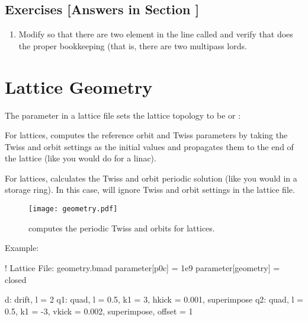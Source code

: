 \documentclass{hitec}     %
\newcommand{\Section}[1]{\section{#1}\vspace*{-1ex}}
\begin{document}
{\newpage

\subsection{Exercises [Answers in Section ]}
\label{s:multipass.ex}

\begin{enumerate}[label=\thesection.\arabic{enumi}]
\item
Modify  so that there are two element in the  line called  and
verify that \bmad does the proper bookkeeping (that is, there are two  multipass lords.
\end{enumerate}

\newpage

\Section{Lattice Geometry}
\label{s:lat.geom}

The  parameter in a lattice file sets the lattice topology to be
 or :
\vspace*{-20pt}
\begin{description}
\item {} \Newline 
For  lattices, \bmad computes the reference orbit and Twiss parameters by taking the
 Twiss and  orbit settings as the initial values and
propagates them to the end of the lattice (like you would do for a linac).
\item {} \Newline 
For  lattices, \bmad calculates the Twiss and orbit periodic solution (like you would in
a storage ring).  In this case, \bmad will ignore Twiss and orbit settings in the lattice file.
\end{description}

\begin{figure}[tb]
  \centering
  \texttt{[image: geometry.pdf]}
  \caption{\bmad computes the periodic Twiss and orbits for  lattices.}
  \label{f:geometry}
\end{figure}

Example:
\begin{code}
! Lattice File: geometry.bmad
parameter[p0c] = 1e9
parameter[geometry] = closed

d: drift, l = 2
q1: quad, l = 0.5, k1 = 3, hkick = 0.001, superimpose
q2: quad, l = 0.5, k1 = -3, vkick = 0.002, superimpose, offset = 1


\end{code}}
\end{document}
